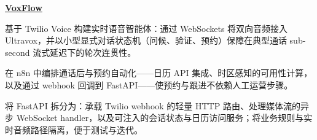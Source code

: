 \begin{twocolentry}{}
\href{https://github.com/faketut/VoxFlow}{\textbf{VoxFlow}}
\end{twocolentry}
\begin{onecolentry}
\begin{highlights}
\item 基于 Twilio Voice 构建实时语音智能体：通过 WebSockets 将双向音频接入 Ultravox，并以小型显式对话状态机（问候、验证、预约）保障在典型通话 sub-second 流式延迟下的轮次连贯性。
\item 在 n8n 中编排通话后与预约自动化——日历 API 集成、时区感知的可用性计算，以及通过 webhook 回调到 FastAPI——使预约与跟进不依赖人工运营步骤。
\item 将 FastAPI 拆分为：承载 Twilio webhook 的轻量 HTTP 路由、处理媒体流的异步 WebSocket handler，以及可注入的会话状态与日历访问服务；将业务规则与实时音频路径隔离，便于测试与迭代。
\end{highlights}
\end{onecolentry}

